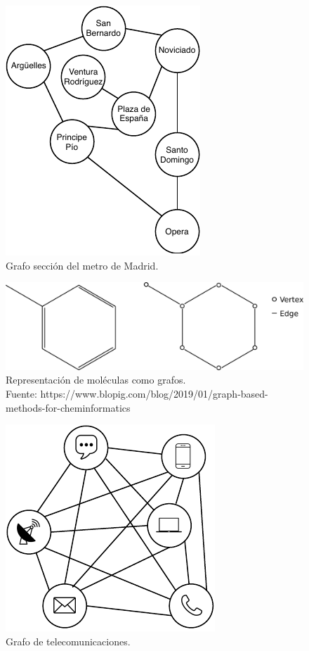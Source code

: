  \begin{figure}[H]
	\centering
	\includegraphics{Figures/metro-graph.pdf}
	\caption{Grafo sección del metro de Madrid.}
	\label{fig:metro-graph}
\end{figure}

 \begin{figure}[H]
	\centering
	\includegraphics[scale=0.3]{Figures/molecula-graph.pdf}
	\caption{Representación de moléculas como grafos.\\ \scriptsize Fuente: https://www.blopig.com/blog/2019/01/graph-based-methods-for-cheminformatics}
	\label{fig:molecula-graph}
\end{figure}

 \begin{figure}[H]
	\centering
	\includegraphics{Figures/teleco-graph.pdf}
	\caption{Grafo de telecomunicaciones.}
	\label{fig:teleco-graph}
\end{figure}

